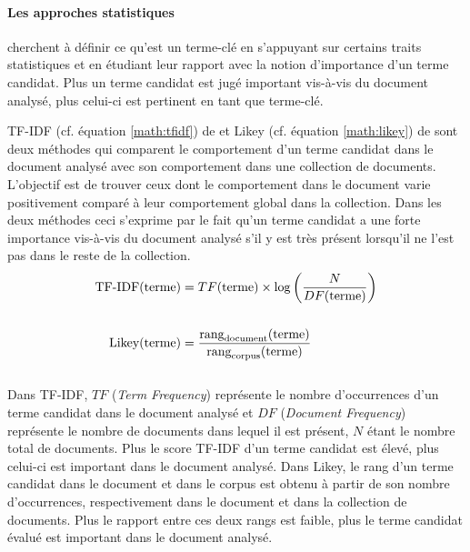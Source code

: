         \paragraph{Les approches statistiques}
          cherchent à définir ce qu'est un terme-clé en s'appuyant sur certains
          traits statistiques et en étudiant leur rapport avec la notion
          d'importance d'un terme candidat. Plus un terme candidat est jugé
          important vis-à-vis du document analysé, plus celui-ci est pertinent en
          tant que terme-clé.

          TF-IDF (cf. équation \ref{math:tfidf}) de \citet{jones1972tfidf} et Likey
          (cf. équation \ref{math:likey}) de \citet{paukkeri2010likey} sont deux
          méthodes qui comparent le comportement d'un terme candidat dans le
          document analysé avec son comportement dans une collection de documents.
          L'objectif est de trouver ceux dont le comportement dans
          le document varie positivement comparé à leur comportement global dans la
          collection. Dans les deux méthodes ceci s'exprime par le fait qu'un terme
          candidat a une forte importance vis-à-vis du document analysé s'il y est
          très présent lorsqu'il ne l'est pas dans le reste de la collection.
          \begin{align}
            \text{TF-IDF}(\text{terme}) &= TF(\text{terme}) \times \log\left(\frac{N}{DF(\text{terme})}\right) \label{math:tfidf}\\
            \notag\\
            \text{Likey}(\text{terme}) &= \frac{\text{rang}_{\text{document}}(\text{terme})}{\text{rang}_{\text{corpus}}(\text{terme})} \label{math:likey}
          \end{align}\\
          Dans TF-IDF, $TF$ (\textit{Term Frequency}) représente le nombre
          d'occurrences d'un terme candidat dans le document analysé et $DF$
          (\textit{Document Frequency}) représente le nombre de documents dans
          lequel il est présent, $N$ étant le nombre total de documents. Plus le
          score TF-IDF d'un terme candidat est élevé, plus celui-ci est important
          dans le document analysé. Dans Likey, le rang d'un terme candidat dans le
          document et dans le corpus est obtenu à partir de son nombre
          d'occurrences, respectivement dans le document et dans la collection de
          documents. Plus le rapport entre ces deux rangs est faible, plus le terme
          candidat évalué est important dans le document analysé.


